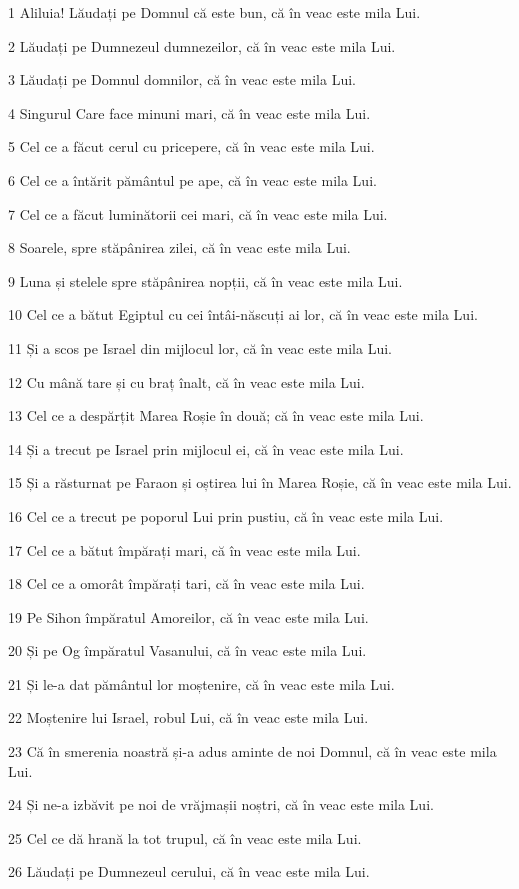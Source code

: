 \par 1 Aliluia! Lăudați pe Domnul că este bun, că în veac este mila Lui.
\par 2 Lăudați pe Dumnezeul dumnezeilor, că în veac este mila Lui.
\par 3 Lăudați pe Domnul domnilor, că în veac este mila Lui.
\par 4 Singurul Care face minuni mari, că în veac este mila Lui.
\par 5 Cel ce a făcut cerul cu pricepere, că în veac este mila Lui.
\par 6 Cel ce a întărit pământul pe ape, că în veac este mila Lui.
\par 7 Cel ce a făcut luminătorii cei mari, că în veac este mila Lui.
\par 8 Soarele, spre stăpânirea zilei, că în veac este mila Lui.
\par 9 Luna și stelele spre stăpânirea nopții, că în veac este mila Lui.
\par 10 Cel ce a bătut Egiptul cu cei întâi-născuți ai lor, că în veac este mila Lui.
\par 11 Și a scos pe Israel din mijlocul lor, că în veac este mila Lui.
\par 12 Cu mână tare și cu braț înalt, că în veac este mila Lui.
\par 13 Cel ce a despărțit Marea Roșie în două; că în veac este mila Lui.
\par 14 Și a trecut pe Israel prin mijlocul ei, că în veac este mila Lui.
\par 15 Și a răsturnat pe Faraon și oștirea lui în Marea Roșie, că în veac este mila Lui.
\par 16 Cel ce a trecut pe poporul Lui prin pustiu, că în veac este mila Lui.
\par 17 Cel ce a bătut împărați mari, că în veac este mila Lui.
\par 18 Cel ce a omorât împărați tari, că în veac este mila Lui.
\par 19 Pe Sihon împăratul Amoreilor, că în veac este mila Lui.
\par 20 Și pe Og împăratul Vasanului, că în veac este mila Lui.
\par 21 Și le-a dat pământul lor moștenire, că în veac este mila Lui.
\par 22 Moștenire lui Israel, robul Lui, că în veac este mila Lui.
\par 23 Că în smerenia noastră și-a adus aminte de noi Domnul, că în veac este mila Lui.
\par 24 Și ne-a izbăvit pe noi de vrăjmașii noștri, că în veac este mila Lui.
\par 25 Cel ce dă hrană la tot trupul, că în veac este mila Lui.
\par 26 Lăudați pe Dumnezeul cerului, că în veac este mila Lui.

